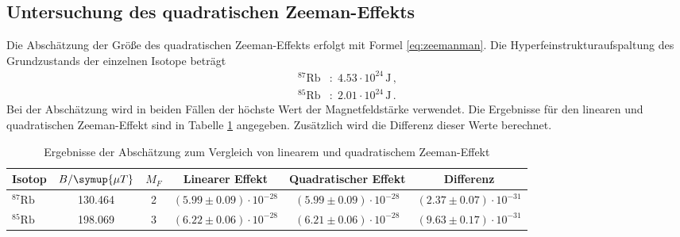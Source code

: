 \subsection{Untersuchung des quadratischen Zeeman-Effekts}
Die Abschätzung der Größe des quadratischen Zeeman-Effekts erfolgt mit Formel \eqref{eq:zeemanman}.
Die Hyperfeinstrukturaufspaltung des Grundzustands der einzelnen Isotope beträgt 
\begin{align*}
    ^{87}\text{Rb}&: \; 4.53 \cdot 10^{24} \, \si{\joule} \, , \\
    ^{85}\text{Rb}&: \; 2.01 \cdot 10^{24} \, \si{\joule} \, .
\end{align*}
Bei der Abschätzung wird in beiden Fällen der höchste Wert der Magnetfeldstärke verwendet.
Die Ergebnisse für den linearen und quadratischen Zeeman-Effekt sind in Tabelle \ref{tab:atab3} angegeben.
Zusätzlich wird die Differenz dieser Werte berechnet. 
\FloatBarrier
\begin{table}[h]
    \centering
    \caption{Ergebnisse der Abschätzung zum Vergleich von linearem und quadratischem Zeeman-Effekt}
    \label{tab:atab3}
    \begin{tabular}{l c c c c c}
        \toprule
        {Isotop} & {$B / \symup{\mu T}$} & {$M_F$} & {Linearer Effekt} & {Quadratischer Effekt} & {Differenz} \\
        \midrule
        {$^{87}\text{Rb}$} & 130.464 & 2 & {$(5.99 \pm 0.09) \cdot 10^{-28}$} & {$(5.99 \pm 0.09) \cdot 10^{-28}$} & {$(2.37 \pm 0.07) \cdot 10^{-31}$} \\
        {$^{85}\text{Rb}$} & 198.069 & 3 & {$(6.22 \pm 0.06) \cdot 10^{-28}$} & {$(6.21 \pm 0.06) \cdot 10^{-28}$} & {$(9.63 \pm 0.17) \cdot 10^{-31}$} \\
        \bottomrule
    \end{tabular}
\end{table}
\FloatBarrier
\noindent

